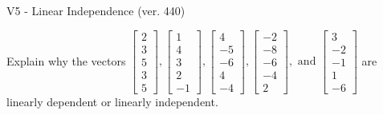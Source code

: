\begin{exercise}
  \begin{exerciseTitle}V5 - Linear Independence (ver. 440)\end{exerciseTitle}
  \begin{exerciseStatement}
    Explain why the vectors \(\left[\begin{array}{r}
2 \\
3 \\
5 \\
3 \\
5
\end{array}\right] , \left[\begin{array}{r}
1 \\
4 \\
3 \\
2 \\
-1
\end{array}\right] , \left[\begin{array}{r}
4 \\
-5 \\
-6 \\
4 \\
-4
\end{array}\right] , \left[\begin{array}{r}
-2 \\
-8 \\
-6 \\
-4 \\
2
\end{array}\right] , \text{ and } \left[\begin{array}{r}
3 \\
-2 \\
-1 \\
1 \\
-6
\end{array}\right]\) are linearly dependent or linearly independent.	



\end{exerciseStatement}
\end{exercise}

